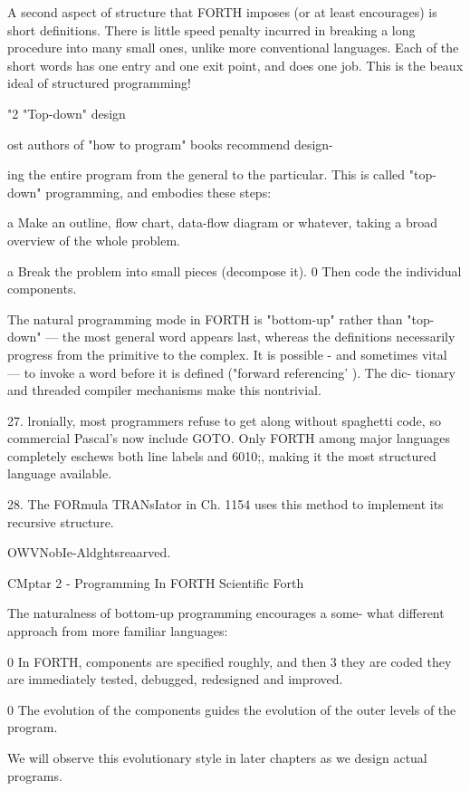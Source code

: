 A second aspect of structure that FORTH imposes (or at least
encourages) is short definitions. There is little speed penalty
incurred in breaking a long procedure into many small ones,
unlike more conventional languages. Each of the short words has
one entry and one exit point, and does one job. This is the beaux
ideal of structured programming!

"2 "Top-down" design

ost authors of "how to program" books recommend design-

ing the entire program from the general to the particular.
This is called "top-down" programming, and embodies these
steps:

a Make an outline, ﬂow chart, data-ﬂow diagram or whatever,
taking a broad overview of the whole problem.

a Break the problem into small pieces (decompose it).
0 Then code the individual components.

The natural programming mode in FORTH is "bottom-up"
rather than "top-down" — the most general word appears last,
whereas the definitions necessarily progress from the primitive
to the complex. It is possible - and sometimes vital — to invoke
a word before it is defined ("forward referencing’ ). The dic-
tionary and threaded compiler mechanisms make this nontrivial.

 

27. lronially, most programmers refuse to get along without spaghetti code, so commercial Pascal's
now include GOTO. Only FORTH among major languages completely eschews both line labels
and 6010;, making it the most structured language available.

28. The FORmula TRANsIator in Ch. 1154 uses this method to implement its recursive structure.

OWVNobIe-Aldghtsreaarved.

CMptar 2 - Programming In FORTH Scientific Forth

The naturalness of bottom-up programming encourages a some-
what different approach from more familiar languages:

0 In FORTH, components are specified roughly, and then 3 they
are coded they are immediately tested, debugged, redesigned
and improved.

0 The evolution of the components guides the evolution of the
outer levels of the program.

We will observe this evolutionary style in later chapters as we
design actual programs.

